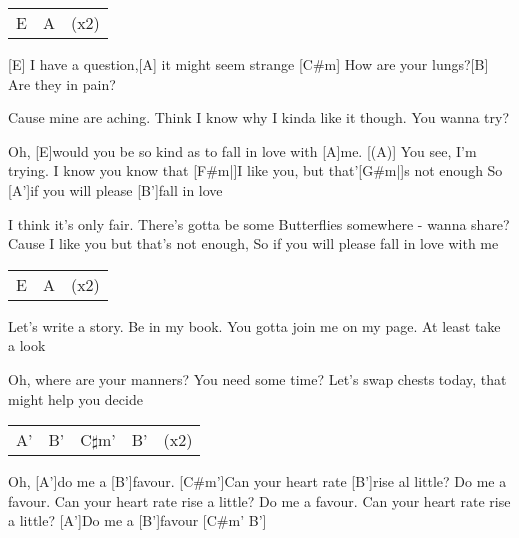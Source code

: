 


\begin{guitar}
	{\footnotesize\begin{tabular}{l|ll}
		E & A & (x2)
	\end{tabular}}
	
	[E] I have a question,[A] it might seem strange
	[C#m] How are your lungs?[B] Are they in pain?
	
	Cause mine are aching. Think I know why
	I kinda like it though. You wanna try?
	
	Oh, [E]would you be so kind as to fall in love with [A]me.
	[(A)] You see, I'm trying. I know you know that 
	[F#m|]{I }like you, but that'[G#m|]{s }not enough
	So [A']if you will please [B']fall in love
	
	I think it's only fair. There's gotta be some 
	Butterflies somewhere - wanna share?
	Cause I like you but that's not enough,
	So if you will please fall in love with me
	
	{\footnotesize\begin{tabular}{l|ll}
			E & A & (x2)
	\end{tabular}}
	
	Let's write a story. Be in my book.
	You gotta join me on my page. At least take a look
	
	Oh, where are your manners? You need some time?
	Let's swap chests today, that might help you decide
	
	 
	
	{\footnotesize\begin{tabular}{l|l|l|ll}
			A' & B' & C$\sharp$m' & B' & (x2)
	\end{tabular}}
	\pagebreak
	Oh, [A']do me a [B']favour. [C#m']Can your heart rate [B']rise al little?
	Do me a favour. Can your heart rate rise a little?
	Do me a favour. Can your heart rate rise a little?
	[A']Do me a [B']favour [C#m' B']{}
	

\end{guitar}
